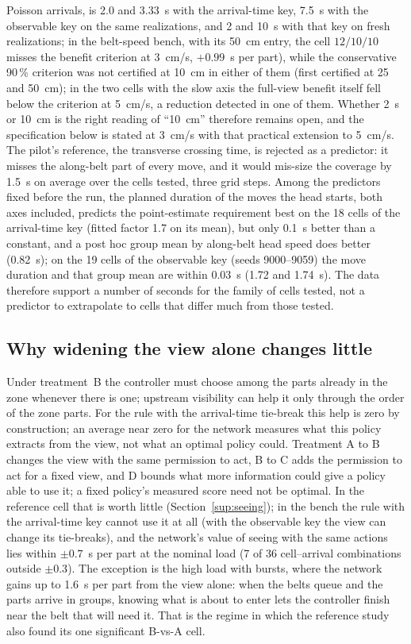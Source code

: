 \documentclass[11pt,a4paper]{article}
\begin{document}
Poisson arrivals, is 2.0 and 3.33~s with the arrival-time key, 7.5~s with the observable
key on the same realizations, and 2 and 10~s with that key on fresh realizations; in the
belt-speed bench, with its 50~cm entry, the cell $12/10/10$ misses the benefit
criterion at 3~cm/s, $+0.99$~s per part), while the conservative
90\,\% criterion was not certified at 10~cm in either of them (first certified at 25 and
50~cm); in the two cells with the
slow axis the full-view benefit itself fell below the criterion at 5~cm/s, a reduction
detected in one of them. Whether 2~s or
10~cm is the right reading of ``10~cm'' therefore remains open, and the specification
below is stated at 3~cm/s with that practical extension to 5~cm/s. The pilot's reference, the transverse
crossing time, is rejected as a predictor: it misses the along-belt part of every move,
and it would mis-size the coverage by 1.5~s on average over the cells tested, three grid
steps. Among the predictors fixed before the run, the planned duration of the moves the
head starts, both axes included, predicts the point-estimate requirement best on the 18
cells of the arrival-time key (fitted factor 1.7 on its mean), but only 0.1~s better than
a constant, and a post hoc group mean by along-belt head speed does better (0.82~s); on the
19 cells of the observable key (seeds 9000--9059) the move duration and that group mean are within 0.03~s
(1.72 and 1.74~s). The data therefore support a number of seconds for the family of cells
tested, not a predictor to extrapolate to cells that differ much from those tested.

\subsection{Why widening the view alone changes little}
Under treatment~B the controller must choose among the parts already in the zone
whenever there is one; upstream visibility can help it only through the order of the
zone parts. For the rule with the arrival-time tie-break this help is zero by construction;
an average near zero for the network measures what this policy extracts from the view, not
what an optimal policy could. Treatment A to B changes the view with the same permission
to act, B to C adds the permission to act for a fixed view, and D bounds what more
information could give a policy able to use it; a fixed policy's measured score need not
be optimal. In the reference cell that is worth little (Section~\ref{sup:seeing}); in the
bench the rule with the arrival-time key cannot use it at all (with the observable key the
view can change its tie-breaks), and the network's value of seeing with the same
actions lies within $\pm0.7$~s per part at the nominal load (7 of 36 cell--arrival
combinations outside $\pm0.3$). The exception is the high load
with bursts, where the network gains up to 1.6~s per part from the view alone: when the
belts queue and the parts arrive in groups, knowing what is about to enter lets the
controller finish near the belt that will need it. That is the regime in which the
reference study also found its one significant B-vs-A cell.
\end{document}
